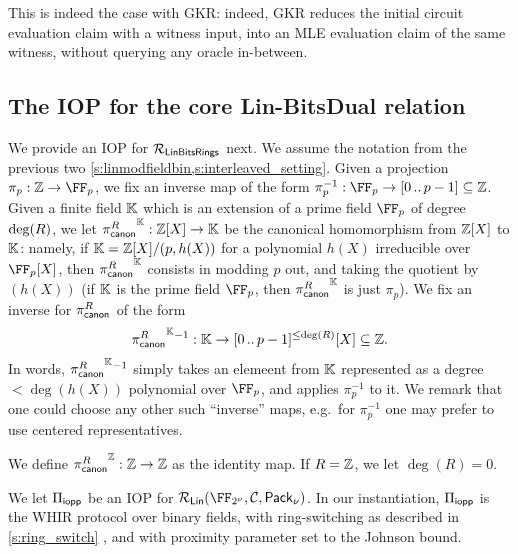 \documentclass[11pt,letterpaper,usenames,dvipsnames]{article}
\begin{document}
This is indeed the case with GKR: indeed, GKR reduces the initial circuit evaluation claim with a witness input, into an MLE evaluation claim of the same witness, without querying any oracle in-between. 

\subsection{The {\ftwoz} IOP for the core Lin-BitsDual relation}
We provide an IOP for $\mathcal{R}_{\mathsf{LinBitsRings}}$ next. We assume the notation from the previous two \cref{s:linmodfieldbin,s:interleaved_setting}.  Given a projection $\pi_{p}:\ZZ \to \FF_{p}$, we fix an inverse map of the form $\pi_{p}^{-1} : \FF_{p} \to \range{0}{p-1} \subseteq \ZZ$. Given a finite field $\mathbb{K}$ which is an extension of a prime field $\FF_p$ of degree $\degevalfield$, we let $\picanon^\KK: \ZZ[X] \to \KK$ be the canonical homomorphism from $\mathbb{Z}[X]$ to $\mathbb{K}$: namely, if $\mathbb{K}=\mathbb{Z}[X]/(p,h(X))$  for a polynomial $h(X)$ irreducible over $\FF_p[X]$, then $\picanon^\KK$ consists in modding $p$ out, and taking the quotient by $(h(X))$ (if $\mathbb{K}$ is the prime field $\FF_p$, then $\picanon^\KK$ is just $\pi_p$). We fix an inverse for $\picanon^{}$ of the form $$\picanon^{\KK}{}^{-1}: \KK \to \range{0}{p-1}^{\leq\degevalfield}[X] \subseteq \ZZ.
$$ In words, $\picanon^{\KK}{}^{-1}$ simply takes an elemeent from $\mathbb{K}$ represented as a degree $< \deg(h(X))$ polynomial over $\FF_p$, and applies $\pi_{p}^{-1}$ to it. We remark that one could choose any other such ``inverse'' maps, e.g.\ for $\pi_{p}^{-1}$ one may prefer to use centered representatives. 

\renewcommand{\evalfield}{R}

\renewcommand{\degevalfield}{\deg(\evalfield)}


We define $\picanon^\ZZ: \ZZ\to\ZZ$ as the identity map.  If $R=\mathbb{Z}$, we let $\degevalfield=0$.

\renewcommand{\picanon}{{\pi_{\mathsf{canon}}^R}}

We let $\Pi_{\mathsf{iopp}}$ be an IOP for $\LIN(\comfield,\cC, \pack)$. In our instantiation, $\Pi_{\mathsf{iopp}}$ is the WHIR protocol \cite{whir} over binary fields, with ring-switching \cite{?} as described in \cref{s:ring_switch} , and with proximity parameter set to the Johnson bound.   
\end{document}
